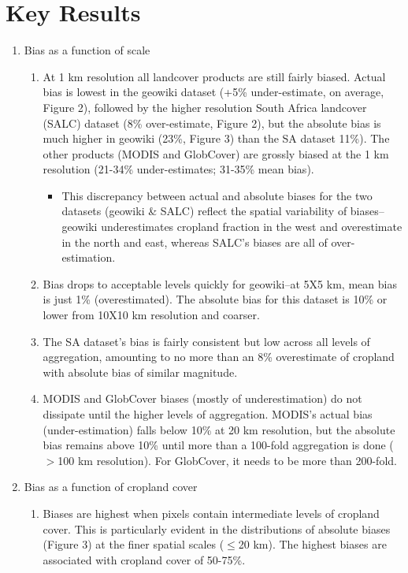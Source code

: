 \documentclass[11 pt]{article}
\begin{document}
\section*{Key Results}
\begin{enumerate}
  \item Bias as a function of scale
    \begin{enumerate}
    \item At 1 km resolution all landcover products are still fairly biased.  Actual bias is lowest in the geowiki dataset (+5\% under-estimate, on average, Figure 2), followed by the higher resolution South Africa landcover (SALC) dataset (8\% over-estimate, Figure 2), but the absolute bias is much higher in geowiki (23\%, Figure 3) than the SA dataset 11\%). The other products (MODIS and GlobCover) are grossly biased at the 1 km resolution (21-34\% under-estimates; 31-35\% mean bias).
      \begin{itemize}
         \item This discrepancy between actual and absolute biases for the two datasets (geowiki \& SALC) reflect the spatial variability of biases--geowiki underestimates cropland fraction in the west and overestimate in the north and east, whereas SALC's biases are all of over-estimation. 
      \end{itemize}
    \item Bias drops to acceptable levels quickly for geowiki--at 5X5 km, mean bias is just 1\% (overestimated). The absolute bias for this dataset is 10\% or lower from 10X10 km resolution and coarser.  
    \item The SA dataset's bias is fairly consistent but low across all levels of aggregation, amounting to no more than an 8\% overestimate of cropland with absolute bias of similar magnitude. 
    \item MODIS and GlobCover biases (mostly of underestimation) do not dissipate until the higher levels of aggregation. MODIS's actual bias (under-estimation) falls below 10\% at 20 km resolution, but the absolute bias remains above 10\% until more than a 100-fold aggregation is done ($>$100 km resolution).  For GlobCover, it needs to be more than 200-fold.  
    \end{enumerate}
  \item Bias as a function of cropland cover
    \begin{enumerate}
      \item Biases are highest when pixels contain intermediate levels of cropland cover.  This is particularly evident in the distributions of absolute biases (Figure 3) at the finer spatial scales ($\leq$20 km). The highest biases are associated with cropland cover of 50-75\%.

\end{enumerate}
\end{enumerate}
\end{document}
